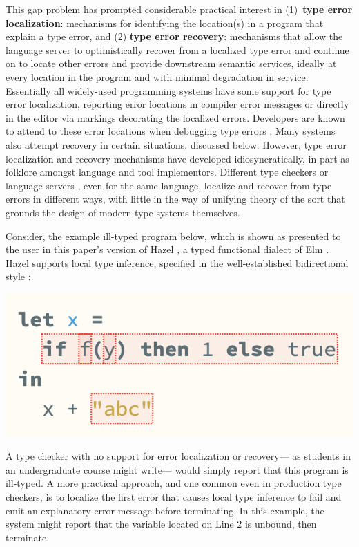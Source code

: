 This gap problem has prompted considerable practical interest in 
(1)~\textbf{type error localization}: mechanisms for identifying the location(s) in a program that explain a type error, and 
(2) \textbf{type error recovery}: mechanisms that allow the language server to optimistically recover from a localized type error 
and continue on to locate other errors and provide downstream semantic services, 
ideally at every location in the program and with minimal degradation in service.
Essentially all widely-used programming systems have some support for type error localization, 
reporting error locations in compiler error messages 
or directly in the editor via markings decorating the localized errors. Developers are known to attend to these error locations when debugging type errors \cite{DBLP:journals/jfp/JoostenBH93}.
Many systems also attempt recovery in certain situations, discussed below. 
However, type error localization and recovery mechanisms have developed idiosyncratically, 
in part as folklore amongst language and tool implementors. 
Different type checkers or language servers \cite{barros2022editing,bour2018merlin}, even for the same language, localize and recover from type errors in different ways, 
with little in the way of unifying theory of the sort that grounds the design of modern type systems themselves.

Consider, the example ill-typed program below, which is shown as presented to the user in
this paper's version of Hazel \cite{hazel}, a typed functional dialect of Elm \cite{elm}. Hazel  
supports local type inference, specified in the well-established bidirectional style \cite{Localinf,HazelnutPOPL,BidirTyping}:
\vspace{-3px}
\begin{center}
    \includegraphics[scale=0.5]{images/hazel-intro-screenshot.png}
\end{center}
\vspace{-3px}
A type checker with no support for error localization or recovery---%
as students in an undergraduate course might write---%
would simply report that this program is ill-typed. 
A more practical approach, and one common even in production type checkers, 
is to localize the first error that causes local type inference to fail and emit an explanatory error message before terminating.
In this example, the system might report that the variable  located on Line 2 is unbound, then terminate.


